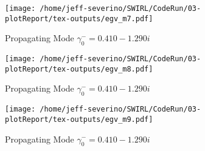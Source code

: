 \documentclass{article}
\begin{document}
 \begin{figure}
     \centering
     \texttt{[image: /home/jeff-severino/SWIRL/CodeRun/03-plotReport/tex-outputs/egv\_m7.pdf]}
     \caption{Propagating Mode $\gamma^-_0 = 0.410-1.290i$}
 \end{figure}


 \begin{figure}
     \centering
     \texttt{[image: /home/jeff-severino/SWIRL/CodeRun/03-plotReport/tex-outputs/egv\_m8.pdf]}
     \caption{Propagating Mode $\gamma^-_0 = 0.410-1.290i$}
 \end{figure}


 \begin{figure}
     \centering
     \texttt{[image: /home/jeff-severino/SWIRL/CodeRun/03-plotReport/tex-outputs/egv\_m9.pdf]}
     \caption{Propagating Mode $\gamma^-_0 = 0.410-1.290i$}
 \end{figure}









\end{document}
